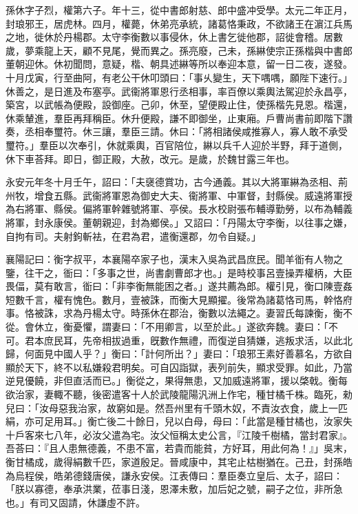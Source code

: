 
\begin{pinyinscope}
孫休字子烈，權第六子。年十三，從中書郎射慈、郎中盛冲受學。太元二年正月，封琅邪王，居虎林。四月，權薨，休弟亮承統，諸葛恪秉政，不欲諸王在濵江兵馬之地，徙休於丹楊郡。太守李衡數以事侵休，休上書乞徙他郡，詔徙會稽。居數歲，夢乘龍上天，顧不見尾，覺而異之。孫亮廢，己未，孫綝使宗正孫楷與中書郎董朝迎休。休初聞問，意疑，楷、朝具述綝等所以奉迎本意，留一日二夜，遂發。十月戊寅，行至曲阿，有老公干休叩頭曰：「事乆變生，天下喁喁，願陛下速行。」休善之，是日進及布塞亭。武衞將軍恩行丞相事，率百僚以乘輿法駕迎於永昌亭，築宮，以武帳為便殿，設御座。己卯，休至，望便殿止住，使孫楷先見恩。楷還，休乘輦進，羣臣再拜稱臣。休升便殿，謙不即御坐，止東廂。戶曹尚書前即階下讚奏，丞相奉璽符。休三讓，羣臣三請。休曰：「將相諸侯咸推寡人，寡人敢不承受璽符。」羣臣以次奉引，休就乘輿，百官陪位，綝以兵千人迎於半野，拜于道側，休下車荅拜。即日，御正殿，大赦，改元。是歲，於魏甘露三年也。

永安元年冬十月壬午，詔曰：「夫襃德賞功，古今通義。其以大將軍綝為丞相、荊州牧，增食五縣。武衞將軍恩為御史大夫、衞將軍、中軍督，封縣侯。威遠將軍授為右將軍、縣侯。偏將軍幹雜號將軍、亭侯。長水校尉張布輔導勤勞，以布為輔義將軍，封永康侯。董朝親迎，封為鄉侯。」又詔曰：「丹陽太守李衡，以往事之嫌，自拘有司。夫射鉤斬袪，在君為君，遣衡還郡，勿令自疑。」

襄陽記曰：衡字叔平，本襄陽卒家子也，漢末入吳為武昌庶民。聞羊衜有人物之鑒，往干之，衜曰：「多事之世，尚書劇曹郎才也。」是時校事呂壹操弄權柄，大臣畏偪，莫有敢言，衜曰：「非李衡無能困之者。」遂共薦為郎。權引見，衡口陳壹姦短數千言，權有愧色。數月，壹被誅，而衡大見顯擢。後常為諸葛恪司馬，幹恪府事。恪被誅，求為丹楊太守。時孫休在郡治，衡數以法繩之。妻習氏每諫衡，衡不從。會休立，衡憂懼，謂妻曰：「不用卿言，以至於此。」遂欲奔魏。妻曰：「不可。君本庶民耳，先帝相拔過重，旣數作無禮，而復逆自猜嫌，逃叛求活，以此北歸，何面見中國人乎？」衡曰：「計何所出？」妻曰：「琅邪王素好善慕名，方欲自顯於天下，終不以私嫌殺君明矣。可自囚詣獄，表列前失，顯求受罪。如此，乃當逆見優饒，非但直活而已。」衡從之，果得無患，又加威遠將軍，援以棨戟。衡每欲治家，妻輙不聽，後密遣客十人於武陵龍陽汎洲上作宅，種甘橘千株。臨死，勑兒曰：「汝母惡我治家，故窮如是。然吾州里有千頭木奴，不責汝衣食，歲上一匹絹，亦可足用耳。」衡亡後二十餘日，兒以白母，母曰：「此當是種甘橘也，汝家失十戶客來七八年，必汝父遣為宅。汝父恒稱太史公言，『江陵千樹橘，當封君家』。吾荅曰：『且人患無德義，不患不富，若貴而能貧，方好耳，用此何為！』」吳末，衡甘橘成，歲得絹數千匹，家道殷足。晉咸康中，其宅止枯樹猶在。己丑，封孫皓為烏程侯，皓弟德錢唐侯，謙永安侯。江表傳曰：羣臣奏立皇后、太子，詔曰：「朕以寡德，奉承洪業，莅事日淺，恩澤未敷，加后妃之號，嗣子之位，非所急也。」有司又固請，休謙虛不許。


\end{pinyinscope}

